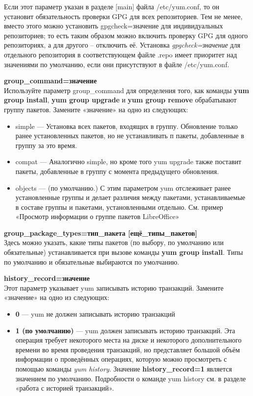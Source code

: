 \documentclass[a4paper,10pt,twoside]{article}
\begin{document}
Если этот параметр указан в разделе [main] файла /etc/yum.conf, то он установит обязательность проверки GPG для всех репозиториев. Тем не менее, вместо этого можно установить gpgcheck=значение для индивидуальных репозиториев; то есть таким образом можно включить проверку GPG для одного репозиториях, а для другого -- отключить её. Установка \textit{gpgcheck=значение} для отдельного репозитория в соответствующем файле .repo имеет приоритет над значениями по умолчанию, если они присутствуют в файле /etc/yum.conf.

\textbf{group\_command=значение}\\
Используйте параметр group\_command для определения того, как команды \textbf{yum group install}, \textbf{yum group upgrade} и \textbf{yum group remove} обрабатывают группу пакетов. Замените «значение» на одно из следующих:

\begin{itemize}
 \item simple — Установка всех пакетов, входящих в группу. Обновление только ранее установленных пакетов, но не устанавливать п пакеты, добавленные в группу за это время.
\item compat — Аналогично simple, но кроме того yum upgrade также поставит пакеты, добавленные в группу с момента предыдущего обновления.
\item objects — (по умолчанию.) С этим параметром yum отслеживает ранее установленные группы и делает различия между пакетами, устанавливаемые в составе группы и пакетами, установленными отдельно. См. пример «Просмотр информации о группе пакетов LibreOffice»
\end{itemize}

\textbf{group\_package\_types=тип\_пакета [ещё\_типы\_пакетов]}\\
Здесь можно указать, какие типы пакетов (по выбору, по умолчанию или обязательные) устанавливается при вызове команды \textbf{yum group install}. Типы по умолчанию и обязательные выбираются по умолчанию. 

\textbf{history\_record=значение}\\
Этот параметр указывает yum записывать историю транзакций. Замените «значение» на одно из следующих:
\begin{itemize}
 \item \textbf{0} — yum не должен записывать историю транзакций
\item \textbf{1 (по умолчанию)} — yum должен записывать историю транзакций. Эта операция требует некоторого места на диске и некоторого дополнительного времени во время проведения транзакций, но представляет большой объём информации о проведённых операциях, которую можно просмотреть с помощью команды \textit{yum history}. Значение \textbf{history\_record=1} является значением по умолчанию. Подробности о команде yum history см. в разделе «работа с историей транзакций».
\end{itemize}
\end{document}

